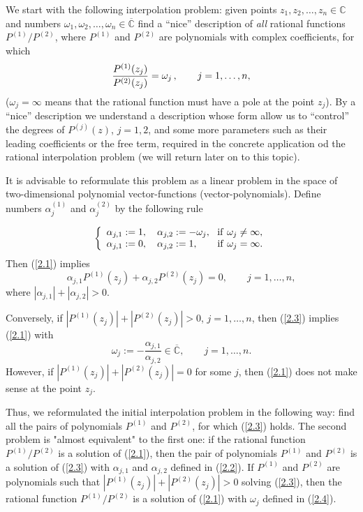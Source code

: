 \documentclass{amsart}
\begin{document}
We start with the following interpolation problem: given points
$z_1,z_2,\ldots,z_n \in \mathbb{C}$ and numbers
$\omega_1,\omega_2,\ldots,\omega_n \in \overline{\mathbb{C}}$ find a
``nice'' description of {\it all} rational functions
$P^{(1)}/P^{(2)}$, where $P^{(1)}$ and $P^{(2)}$ are polynomials
with complex coefficients, for which
\begin{equation} \label{2.1}
{ P^{(1)}(z_j) \over P^{(2)}(z_j) } = \omega_j \,, \qquad
j=1,\ldots,n,
\end{equation}
($\omega_j=\infty$ means that the rational function must have a
pole at the point $z_j$). By a ``nice'' description we understand
a description whose form allow us to ``control'' the degrees of
$P^{(j)}(z)$, $j=1,2$, and some more parameters such as their
leading coefficients or the free term, required in the concrete
application od the rational interpolation problem (we will return
later on to this topic).

It is advisable to reformulate this problem as a linear problem in
the space of two-dimensional polynomial vector-functions
(vector-polynomials). Define numbers $\alpha^{(1)}_j$ and
$\alpha^{(2)}_j$ by the following rule

\begin{equation} \label{2.2}
\left\{\begin{array}{l} \alpha_{j,1} := 1, \quad \alpha_{j,2} :=
-\omega_j, \ \  {\rm if} \ \omega_j \ne \infty , \\
\alpha_{j,1} := 0, \quad \alpha_{j,2} := 1, \qquad {\rm if}
\ \omega_j = \infty .\\
\end{array}
\right.
\end{equation}
Then (\ref{2.1}) implies
\begin{equation} \label{2.3}
\alpha_{j,1} P^{(1)}(z_j) + \alpha_{j,2} P^{(2)}(z_j) = 0, \qquad
j=1,\ldots,n,
\end{equation}
where $|\alpha_{j,1}| + |\alpha_{j,2}| > 0$.

Conversely, if $|P^{(1)}(z_j)| + |P^{(2)}(z_j)| >0$, $j=1,\ldots,n$,
then (\ref{2.3}) implies (\ref{2.1}) with
\begin{equation} \label{2.4}
\omega_j := - \frac{\alpha_{j,1}}{\alpha_{j,2}} \in
\overline{\mathbb{C}}, \qquad j=1,\ldots,n.
\end{equation}
However, if $|P^{(1)}(z_j)| + |P^{(2)}(z_j)|=0$ for some $j$, then
(\ref{2.1}) does not make sense at the point $z_j$.

Thus, we reformulated the initial interpolation problem in the
following way: find all the pairs of polynomials $P^{(1)}$ and
$P^{(2)}$, for which (\ref{2.3}) holds. The second problem is
"almost equivalent" to the first one: if the rational function
$P^{(1)}/P^{(2)}$ is a solution of (\ref{2.1}), then the pair of
polynomials $P^{(1)}$ and $P^{(2)}$ is a solution of (\ref{2.3})
with $\alpha_{j,1}$ and $\alpha_{j,2}$ defined in (\ref{2.2}). If
$P^{(1)}$ and $P^{(2)}$ are polynomials such that $|P^{(1)}(z_j)| +
|P^{(2)}(z_j)|>0$ solving (\ref{2.3}), then the rational function
$P^{(1)}/P^{(2)}$ is a solution of (\ref{2.1}) with ${\omega}_j$ defined
in (\ref{2.4}).
\end{document}

